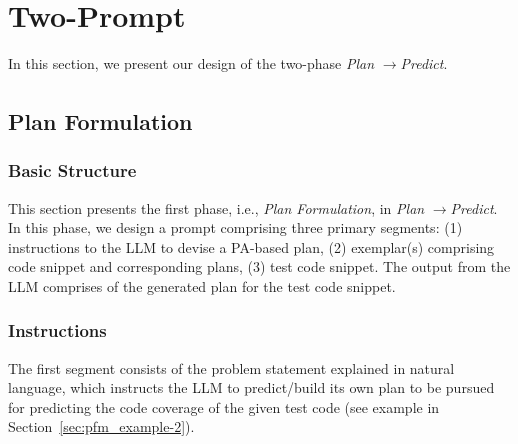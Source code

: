 \section{Two-Prompt \tool}\label{sec:plan->predict}
In this section, we present our design of the two-phase \textit{Plan} $\xrightarrow[]{}$\textit{Predict}.

\subsection{Plan Formulation}
\subsubsection{Basic Structure}
This section presents the first phase, i.e., \textit{Plan Formulation}, in \textit{Plan} $\xrightarrow{}$\textit{Predict}. In this phase, we design a prompt comprising three primary segments: (1) instructions to the LLM to devise a PA-based plan, (2) exemplar(s) comprising code snippet and corresponding plans, (3) test code snippet. The output from the LLM comprises of the generated plan for the test code snippet.



\subsubsection*{Instructions} The first segment consists of the problem statement explained in natural language, which instructs the LLM to predict/build its own plan to be pursued for predicting the code coverage of the given
test code (see example in Section~\ref{sec:pfm_example-2}).

